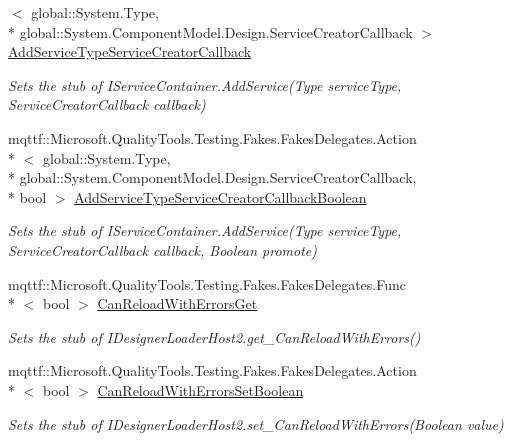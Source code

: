 \begin{DoxyCompactItemize}
$<$ global\-::\-System.\-Type, \\*
global\-::\-System.\-Component\-Model.\-Design.\-Service\-Creator\-Callback $>$ \hyperlink{class_system_1_1_component_model_1_1_design_1_1_serialization_1_1_fakes_1_1_stub_i_designer_loader_host2_a3611afc5ec07574af131f10e9c851e91}{Add\-Service\-Type\-Service\-Creator\-Callback}
\begin{DoxyCompactList}\small\item\em Sets the stub of I\-Service\-Container.\-Add\-Service(\-Type service\-Type, Service\-Creator\-Callback callback)\end{DoxyCompactList}\item 
mqttf\-::\-Microsoft.\-Quality\-Tools.\-Testing.\-Fakes.\-Fakes\-Delegates.\-Action\\*
$<$ global\-::\-System.\-Type, \\*
global\-::\-System.\-Component\-Model.\-Design.\-Service\-Creator\-Callback, \\*
bool $>$ \hyperlink{class_system_1_1_component_model_1_1_design_1_1_serialization_1_1_fakes_1_1_stub_i_designer_loader_host2_a23ad488e23ab3585b23751bf69c38015}{Add\-Service\-Type\-Service\-Creator\-Callback\-Boolean}
\begin{DoxyCompactList}\small\item\em Sets the stub of I\-Service\-Container.\-Add\-Service(\-Type service\-Type, Service\-Creator\-Callback callback, Boolean promote)\end{DoxyCompactList}\item 
mqttf\-::\-Microsoft.\-Quality\-Tools.\-Testing.\-Fakes.\-Fakes\-Delegates.\-Func\\*
$<$ bool $>$ \hyperlink{class_system_1_1_component_model_1_1_design_1_1_serialization_1_1_fakes_1_1_stub_i_designer_loader_host2_a8f4e5016b53365f42b72bf7b14bf31de}{Can\-Reload\-With\-Errors\-Get}
\begin{DoxyCompactList}\small\item\em Sets the stub of I\-Designer\-Loader\-Host2.\-get\-\_\-\-Can\-Reload\-With\-Errors()\end{DoxyCompactList}\item 
mqttf\-::\-Microsoft.\-Quality\-Tools.\-Testing.\-Fakes.\-Fakes\-Delegates.\-Action\\*
$<$ bool $>$ \hyperlink{class_system_1_1_component_model_1_1_design_1_1_serialization_1_1_fakes_1_1_stub_i_designer_loader_host2_a301f21b1ec1997cd7ffe6c74ff2f019d}{Can\-Reload\-With\-Errors\-Set\-Boolean}
\begin{DoxyCompactList}\small\item\em Sets the stub of I\-Designer\-Loader\-Host2.\-set\-\_\-\-Can\-Reload\-With\-Errors(\-Boolean value)\end{DoxyCompactList}\item 

\end{DoxyCompactItemize}
